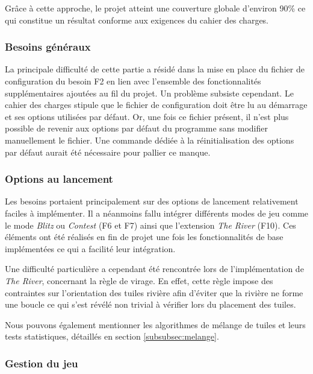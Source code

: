 \documentclass[11pt]{article}
\begin{document}
Grâce à cette approche, le projet atteint une couverture globale 
d'environ 90\% ce qui constitue un résultat conforme aux exigences 
du cahier des charges.


\subsubsection{Besoins généraux}

La principale difficulté de cette partie a résidé dans la mise en place du 
fichier de configuration du besoin F2 en lien avec l'ensemble des fonctionnalités 
supplémentaires ajoutées au fil du projet.
Un problème subsiste cependant. Le cahier des charges stipule que le 
fichier de configuration doit être lu au démarrage et ses options utilisées 
par défaut. Or, une fois ce fichier présent, il n'est plus possible de 
revenir aux options par défaut du programme sans modifier manuellement 
le fichier. Une commande dédiée à la réinitialisation des options par 
défaut aurait été nécessaire pour pallier ce manque.

\subsubsection{Options au lancement}

Les besoins portaient 
principalement sur des options de lancement relativement faciles à 
implémenter. Il a néanmoins fallu intégrer différents modes de jeu 
comme le mode \textit{Blitz} ou \textit{Contest} (F6 et F7) ainsi que l'extension 
\textit{The River} (F10). Ces éléments ont été réalisés en fin de projet une 
fois les fonctionnalités de base implémentées ce qui a facilité leur 
intégration.

Une difficulté particulière a cependant été rencontrée lors de 
l'implémentation de \textit{The River}, concernant la règle de virage. 
En effet, cette règle impose des contraintes sur l'orientation des tuiles 
rivière afin d'éviter que la rivière ne forme une boucle ce qui s'est 
révélé non trivial à vérifier lors du placement des tuiles.

Nous pouvons également mentionner les algorithmes de mélange de tuiles 
et leurs tests statistiques, détaillés en section \ref{subsubsec:melange}.



\subsubsection{Gestion du jeu}
\end{document}
